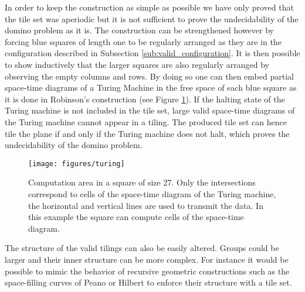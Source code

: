 \documentclass{jac}
\begin{document}
In order to keep the construction as simple as possible we have only proved that the tile set was aperiodic but it is not sufficient to prove the undecidability of the domino problem as it is. The construction can be strengthened however by forcing blue squares of length one to be regularly arranged as they are in the configuration described in Subsection \ref{sub:valid_configuration}. It is then possible to show inductively that the larger squares are also regularly arranged by observing the empty columns and rows. By doing so one can then embed partial space-time diagrams of a Turing Machine in the free space of each blue square as it is done in Robinson's construction (see Figure \ref{fig:turing}). If the halting state of the Turing machine is not included in the tile set, large valid space-time diagrams of the Turing machine cannot appear in a tiling. The produced tile set can hence tile the plane if and only if the Turing machine does not halt, which proves the undecidability of the domino problem.

\begin{figure}[htbp]
	\centering
	\texttt{[image: figures/turing]}
	\caption{Computation area in a square of size 27. Only the intersections correspond to cells of the space-time diagram of the Turing machine, the horizontal and vertical lines are used to transmit the data. In this example the square can compute  cells of the space-time diagram.}
	\label{fig:turing}
\end{figure}

The structure of the valid tilings can also be easily altered. Groups could be larger and their inner structure can be more complex. For instance it would be possible to mimic the behavior of recursive geometric constructions such as the space-filling curves of Peano \cite{Peano1890} or Hilbert \cite{Hilbert1891} to enforce their structure with a tile set.




\end{document}
